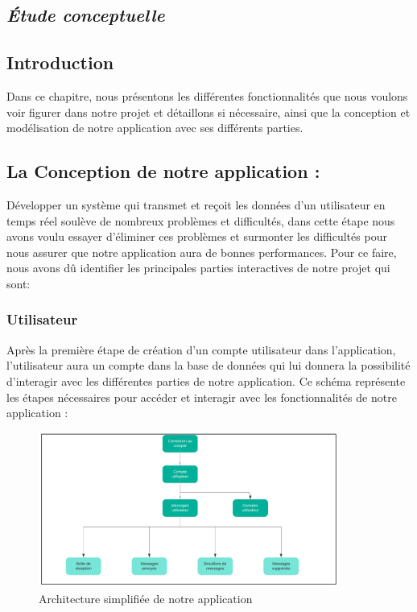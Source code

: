 \documentclass[french]{report}
\begin{document}
\baselineskip=2.0pt
\setcounter{chapter}{1}

\begin{titlepage}
\renewcommand*{\thepage}{\arabic{page}}%
\setcounter{page}{27}%
\newpage
\chapter{
\textit{ Étude conceptuelle }
}
\end{titlepage}
\renewcommand*{\thepage}{\arabic{page}}%
\setcounter{page}{28}%
\newpage
\section{\huge Introduction}     
\LARGE Dans ce chapitre, nous présentons les différentes fonctionnalités que nous voulons voir figurer dans notre projet et détaillons si nécessaire, ainsi que la conception et modélisation de notre application avec ses différents parties.\\
\section{\huge La Conception de notre application :}
\LARGE Développer un système qui transmet et reçoit les données d'un utilisateur en temps réel soulève de nombreux problèmes et difficultés, dans cette étape nous avons voulu essayer d'éliminer ces problèmes et surmonter les difficultés pour nous assurer que notre application aura de bonnes performances.
Pour ce faire, nous avons dû identifier les principales parties interactives de notre projet qui sont: \\
\subsection{\LARGE Utilisateur}
\LARGE Après la première étape de création d'un compte utilisateur dans l'application, l'utilisateur aura un compte dans la base de données qui lui donnera la possibilité d'interagir avec les différentes parties de notre application.
Ce schéma représente les étapes nécessaires pour accéder et interagir avec les fonctionnalités de notre application : \\
\begin{figure}[H]
    \centering
    \includegraphics[width=0.88\textwidth]{Architecture de notre application}
    \caption{Architecture simplifiée de notre application}
    \label{fig:Architecture}
\end{figure}
\end{document}
